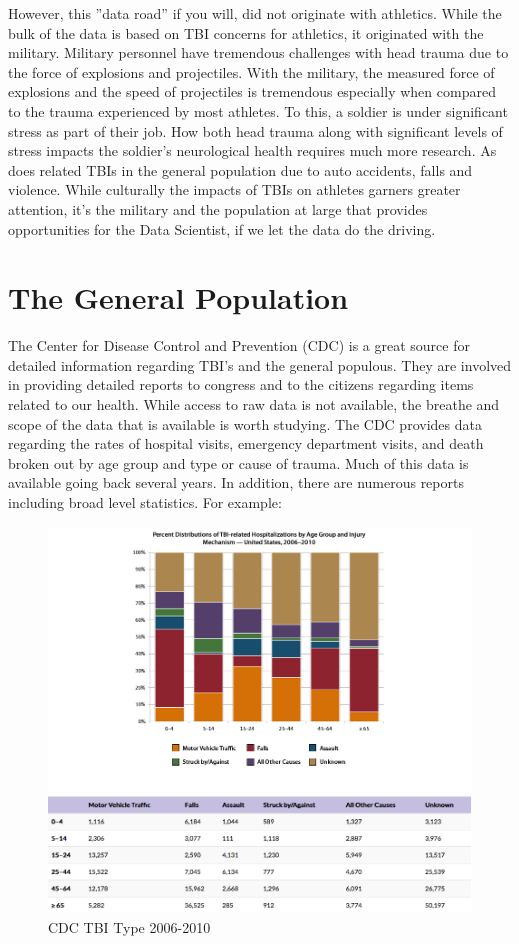 \documentclass[sigconf]{acmart}
\begin{document}
However, this ''data road'' if you will, did not originate with athletics.  While the bulk of the data is based on TBI concerns for athletics, it originated with the military.  Military personnel have tremendous challenges with head trauma due to the force of explosions and projectiles.  With the military, the measured force of explosions and the speed of projectiles is tremendous especially when compared to the trauma experienced by most athletes.  To this, a soldier is under significant stress as part of their job.  How both head trauma along with significant levels of stress impacts the soldier's neurological health requires much more research.  As does related TBIs in the general population due to auto accidents, falls and violence.  While culturally the impacts of TBIs on athletes garners greater attention, it's the military and the population at large that provides opportunities for the Data Scientist, if we let the data do the driving.  

\section{The General Population}

The Center for Disease Control and Prevention (CDC) is a great source for detailed information regarding TBI's and the general populous.  They are involved in providing detailed reports to congress and to the citizens regarding items related to our health.  While access to raw data is not available, the breathe and scope of the data that is available is worth studying.  The CDC provides data regarding the rates of hospital visits, emergency department visits, and death broken out by age group and type or cause of trauma.  Much of this data is available going back several years.  In addition, there are numerous reports including broad level statistics.  For example:

\begin{figure}[h]
\includegraphics[width=\columnwidth]{images/graph1.png}
\caption{CDC TBI Type 2006-2010}\label{f:CDC TBI Type 2006-2010}
\end{figure}
\end{document}
